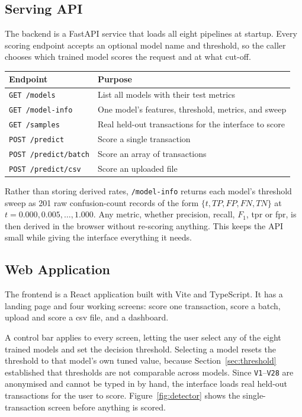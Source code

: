 \subsection{Serving API}

The backend is a FastAPI service that loads all eight pipelines at startup. Every scoring
endpoint accepts an optional model name and threshold, so the caller chooses which trained
model scores the request and at what cut-off.

\begin{center}
\small
\begin{tabularx}{\textwidth}{@{}lY@{}}
\hline
\textbf{Endpoint} & \textbf{Purpose} \\
\hline
\texttt{GET /models}          & List all models with their test metrics \\
\texttt{GET /model-info}      & One model's features, threshold, metrics, and sweep \\
\texttt{GET /samples}         & Real held-out transactions for the interface to score \\
\texttt{POST /predict}        & Score a single transaction \\
\texttt{POST /predict/batch}  & Score an array of transactions \\
\texttt{POST /predict/csv}    & Score an uploaded file \\
\hline
\end{tabularx}
\end{center}

Rather than storing derived rates, \texttt{/model-info} returns each model's threshold sweep
as 201 raw confusion-count records of the form $\{t, TP, FP, FN, TN\}$ at
$t = 0.000, 0.005, \dots, 1.000$. Any metric, whether precision, recall, $F_1$, \gls{tpr} or
\gls{fpr}, is then derived in the browser without re-scoring anything. This keeps the API
small while giving the interface everything it needs.

\subsection{Web Application}

The frontend is a React application built with Vite and TypeScript. It has a landing page
and four working screens: score one transaction, score a batch, upload and score a
\gls{csv} file, and a dashboard.

A control bar applies to every screen, letting the user select any of the eight trained
models and set the decision threshold. Selecting a model resets the threshold to that
model's own tuned value, because Section~\ref{sec:threshold} established that thresholds
are not comparable across models. Since \texttt{V1}--\texttt{V28} are anonymised and cannot
be typed in by hand, the interface loads real held-out transactions for the user to score.
Figure~\ref{fig:detector} shows the single-transaction screen before anything is scored.

